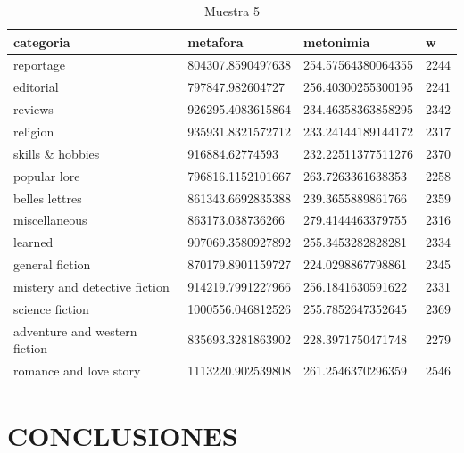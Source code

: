 \documentclass[twoside]{article}
\begin{document}
\begin{center}
\begin{longtable}{| p{} | p{} | p{}|p{}|}
\caption{Muestra 5}
    \hline
        categoria & metafora & metonimia & w \\ \hline
        reportage & 804307.8590497638 & 254.57564380064355 & 2244 \\ \hline
        editorial & 797847.982604727 & 256.40300255300195 & 2241 \\ \hline
        reviews & 926295.4083615864 & 234.46358363858295 & 2342 \\ \hline
        religion & 935931.8321572712 & 233.24144189144172 & 2317 \\ \hline
        skills \& hobbies & 916884.62774593 & 232.22511377511276 & 2370 \\ \hline
        popular lore & 796816.1152101667 & 263.7263361638353 & 2258 \\ \hline
        belles lettres & 861343.6692835388 & 239.3655889861766 & 2359 \\ \hline
        miscellaneous & 863173.038736266 & 279.4144463379755 & 2316 \\ \hline
        learned & 907069.3580927892 & 255.3453282828281 & 2334 \\ \hline
        general fiction & 870179.8901159727 & 224.0298867798861 & 2345 \\ \hline
        mistery and detective fiction & 914219.7991227966 & 256.1841630591622 & 2331 \\ \hline
        science fiction & 1000556.046812526 & 255.7852647352645 & 2369 \\ \hline
        adventure and western fiction & 835693.3281863902 & 228.3971750471748 & 2279 \\ \hline
        romance and love story & 1113220.902539808 & 261.2546370296359 & 2546 \\ \hline
\end{longtable}
    \label{muestra5}
\end{center}
\section{CONCLUSIONES}
\label{sec:org5b2264d}




 
\end{document}
